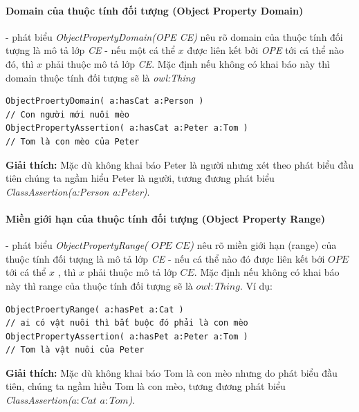 \paragraph{Domain của thuộc tính đối tượng (Object Property Domain)} - phát biểu \textit{ObjectPropertyDomain(OPE CE)} nêu rõ domain của thuộc tính đối tượng là mô tả lớp \textit{CE} -  nếu một cá thể $x$ được liên kết bởi \textit{OPE} tới cá thể nào đó, thì $x$ phải thuộc mô tả lớp \textit{CE}. Mặc định nếu không có khai báo này thì domain thuộc tính đối tượng sẽ là \textit{owl:Thing}
\begin{verbatim}
ObjectProertyDomain( a:hasCat a:Person ) 
// Con người mới nuôi mèo
ObjectPropertyAssertion( a:hasCat a:Peter a:Tom ) 
// Tom là con mèo của Peter
\end{verbatim}
\textbf{Giải thích:} Mặc dù không khai báo Peter là người nhưng xét theo phát biểu đầu tiên chúng ta ngầm hiểu Peter là người, tương đương phát biểu \textit{ClassAssertion(a:Person a:Peter)}.


\paragraph{Miền giới hạn của thuộc tính đối tượng (Object Property Range)} - phát biểu \textit{ObjectPropertyRange( $OPE$ $CE$)} nêu rõ miền giới hạn (range) của thuộc tính đối tượng là mô tả lớp \textit{CE} -  nếu cá thể nào đó được liên kết bới $OPE$ tới cá thể $x$ , thì $x$ phải thuộc mô tả lớp $CE$. Mặc định nếu không có khai báo này thì range của thuộc tính đối tượng sẽ là $owl:Thing$. Ví dụ:
\begin{verbatim}
ObjectProertyRange( a:hasPet a:Cat ) 
// ai có vật nuôi thì bắt buộc đó phải là con mèo
ObjectPropertyAssertion( a:hasPet a:Peter a:Tom ) 
// Tom là vật nuôi của Peter
\end{verbatim}
\textbf{Giải thích:} Mặc dù không khai báo Tom là con mèo nhưng do phát biểu đầu tiên, chúng ta ngầm hiều Tom là con mèo, tương đương phát biểu \textit{ClassAssertion($a:Cat$ $a:Tom$)}.


